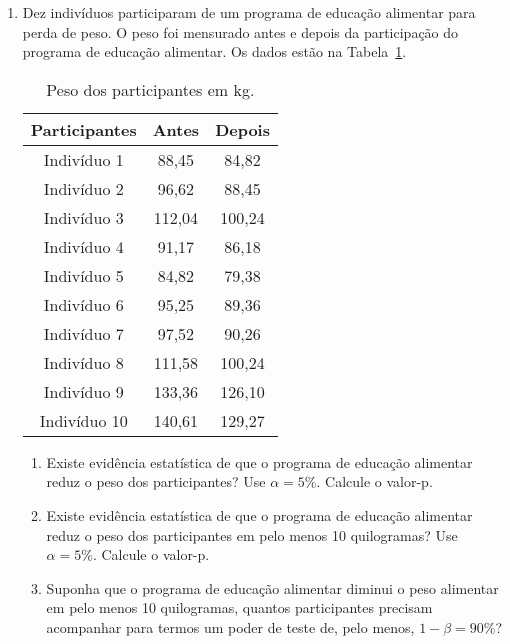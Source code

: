 \documentclass[8pt, a4paper]{article}
\begin{document}
\begin{enumerate}
	\item Dez indivíduos participaram de um programa de educação alimentar para perda de peso. O peso foi mensurado antes e depois da participação do programa de educação alimentar. Os dados estão na Tabela~\ref{tab:participante-kg}.
	\begin{table}[ht]
		\centering
		\begin{tabular}{c|cc}
			\toprule[0.05cm]
			Participantes & Antes & Depois \\ 
			\midrule[0.025cm]
			Indivíduo 1 & 88,45 & 84,82 \\ 
			Indivíduo 2 & 96,62 & 88,45 \\ 
			Indivíduo 3 & 112,04 & 100,24 \\ 
			Indivíduo 4 & 91,17 & 86,18 \\ 
			Indivíduo 5 & 84,82 & 79,38 \\ 
			Indivíduo 6 & 95,25 & 89,36 \\ 
			Indivíduo 7 & 97,52 & 90,26 \\ 
			Indivíduo 8 & 111,58 & 100,24 \\ 
			Indivíduo 9 & 133,36 & 126,10 \\ 
			Indivíduo 10 & 140,61 & 129,27 \\ 
			\bottomrule[0.05cm]
		\end{tabular}
		\caption{Peso dos participantes em kg.} 
		\label{tab:participante-kg}
	\end{table}
	\begin{enumerate}
		\item Existe evidência estatística de que o programa de educação alimentar reduz o peso dos participantes? Use $\alpha = 5\%$. Calcule o valor-p. 
		\item Existe evidência estatística de que o programa de educação alimentar reduz o peso dos participantes em pelo menos 10 quilogramas? Use $\alpha = 5\%$. Calcule o valor-p. 
		\item Suponha que o programa de educação alimentar diminui o peso alimentar em pelo menos 10 quilogramas, quantos participantes precisam acompanhar para termos um poder de teste de, pelo menos, $1-\beta = 90\%$? 
	\end{enumerate}


\end{enumerate}
\end{document}
